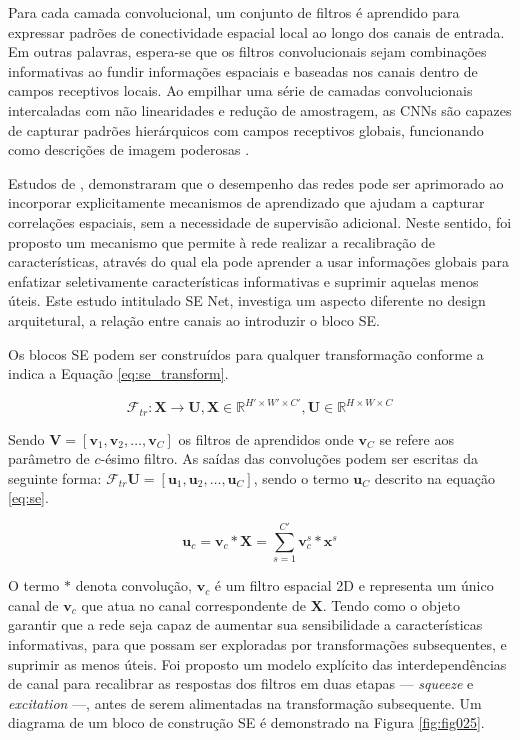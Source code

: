 Para cada camada convolucional, um conjunto de filtros é aprendido para expressar padrões de conectividade espacial local ao longo dos canais de entrada. Em outras palavras, espera-se que os filtros convolucionais sejam combinações informativas ao fundir informações espaciais e baseadas nos canais dentro de campos receptivos locais.
Ao empilhar uma série de camadas convolucionais intercaladas com não linearidades e redução de amostragem, as \gls{CNN}s são capazes de capturar padrões hierárquicos com campos receptivos globais, funcionando como descrições de imagem poderosas \cite{huSqueezeandExcitationNetworks2018}. 

Estudos de , demonstraram que o desempenho das redes pode ser aprimorado ao incorporar explicitamente mecanismos de aprendizado que ajudam a capturar correlações espaciais, sem a necessidade de supervisão adicional. Neste sentido, foi proposto um mecanismo que permite à rede realizar a recalibração de características, através do qual ela pode aprender a usar informações globais para enfatizar seletivamente características informativas e suprimir aquelas menos úteis. Este estudo intitulado \gls{SE} Net, investiga um aspecto diferente no design arquitetural, a relação entre canais ao introduzir o bloco \gls{SE}.

Os blocos \gls{SE} podem ser construídos para qualquer transformação conforme a indica a Equação \ref{eq:se_transform}. 

\begin{equation}
\mathcal{F}_{tr} : \mathbf{X} \rightarrow \mathbf{U}, \mathbf{X} \in \mathbb{R}^{H' \times W' \times C'}, \mathbf{U} \in \mathbb{R}^{H \times W \times C}
\label{eq:se_transform}
\end{equation}

Sendo $\mathbf{V} = [\mathbf{v}_1, \mathbf{v}_2, \ldots, \mathbf{v}_C]$ os filtros de aprendidos onde $\mathbf{v}_C$ se refere aos parâmetro de $c$-ésimo filtro. As saídas das convoluções podem ser escritas da seguinte forma: $\mathcal{F}_{tr} \mathbf{U} = [\mathbf{u}_1, \mathbf{u}_2, \ldots, \mathbf{u}_C]$, sendo o termo $\mathbf{u}_C$ descrito na equação \ref{eq:se}. 

\begin{equation}
\mathbf{u}_c = \mathbf{v}_c \ast \mathbf{X} = \sum_{s=1}^{C'} \mathbf{v}_c^s \ast \mathbf{x}^s
\label{eq:se}
\end{equation}

O termo $\ast$ denota convolução, $\mathbf{v}_c$ é um filtro espacial 2D e representa um único canal de $\mathbf{v}_c$ que atua no canal correspondente de $\mathbf{X}$. 
Tendo como o objeto garantir que a rede seja capaz de aumentar sua sensibilidade a características informativas, para que possam ser exploradas por transformações subsequentes, e suprimir as menos úteis. Foi proposto um modelo explícito das interdependências de canal para recalibrar as respostas dos filtros em duas etapas — \textit{squeeze} e \textit{excitation} —, antes de serem alimentadas na transformação subsequente. Um diagrama de um bloco de construção \gls{SE} é demonstrado na Figura \ref{fig:fig025}.

